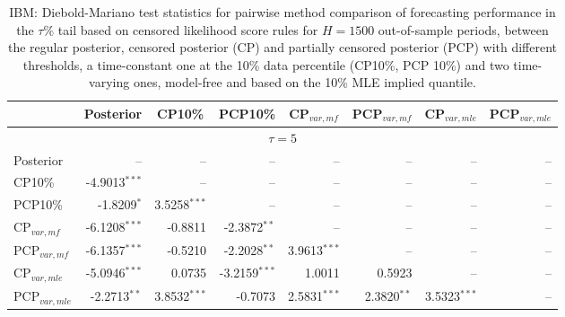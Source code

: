 { \renewcommand{\arraystretch}{1.2} 
 {\footnotesize 
\begin{table} 
\center 
\begin{tabular}{l | rrrrrrr} 
& \multicolumn{1}{c}{Posterior}& \multicolumn{1}{c}{CP10\%}& \multicolumn{1}{c}{PCP10\%}& \multicolumn{1}{c}{CP$_{var,mf}$}& \multicolumn{1}{c}{PCP$_{var,mf}$}& \multicolumn{1}{c}{CP$_{var,mle}$}& \multicolumn{1}{c}{PCP$_{var,mle}$} \\ \hline 
\multicolumn{8}{c}{$\tau = 5$} \\ \hline 
Posterior &    --\phantom{$^{***}$} &    --\phantom{$^{***}$} &    --\phantom{$^{***}$} &    --\phantom{$^{***}$} &    --\phantom{$^{***}$} &    --\phantom{$^{***}$} &    --\phantom{$^{***}$}   \\ 
CP10\% & -4.9013$^{***}$ &    --\phantom{$^{***}$} &    --\phantom{$^{***}$} &    --\phantom{$^{***}$} &    --\phantom{$^{***}$} &    --\phantom{$^{***}$} &    --\phantom{$^{***}$}   \\ 
PCP10\% & -1.8209$^{*}$\phantom{$^{**}$} & 3.5258$^{***}$ &    --\phantom{$^{***}$} &    --\phantom{$^{***}$} &    --\phantom{$^{***}$} &    --\phantom{$^{***}$} &    --\phantom{$^{***}$}   \\ 
CP$_{var,mf}$ & -6.1208$^{***}$ & -0.8811\phantom{$^{***}$} & -2.3872$^{**}$\phantom{$^{*}$} &    --\phantom{$^{***}$} &    --\phantom{$^{***}$} &    --\phantom{$^{***}$} &    --\phantom{$^{***}$}   \\ 
PCP$_{var,mf}$ & -6.1357$^{***}$ & -0.5210\phantom{$^{***}$} & -2.2028$^{**}$\phantom{$^{*}$} & 3.9613$^{***}$ &    --\phantom{$^{***}$} &    --\phantom{$^{***}$} &    --\phantom{$^{***}$}   \\ 
CP$_{var,mle}$ & -5.0946$^{***}$ & 0.0735\phantom{$^{***}$} & -3.2159$^{***}$ & 1.0011\phantom{$^{***}$} & 0.5923\phantom{$^{***}$} &    --\phantom{$^{***}$} &    --\phantom{$^{***}$}   \\ 
PCP$_{var,mle}$ & -2.2713$^{**}$\phantom{$^{*}$} & 3.8532$^{***}$ & -0.7073\phantom{$^{***}$} & 2.5831$^{***}$ & 2.3820$^{**}$\phantom{$^{*}$} & 3.5323$^{***}$ &    --\phantom{$^{***}$}   \\ 
\hline 
\end{tabular}
 \caption{IBM: Diebold-Mariano test statistics for pairwise method comparison  of forecasting performance in the $\tau$\% tail based on  censored likelihood score rules for $H=1500$ out-of-sample periods,  between  the regular posterior, censored posterior (CP) and  partially censored posterior (PCP) with different thresholds,  a time-constant one at the 10\% data percentile (CP10\%, PCP 10\%) and two time-varying ones, model-free and based on the 10\% MLE implied quantile. }
\label{tab:IBM_DM_5}  
\end{table}
}}